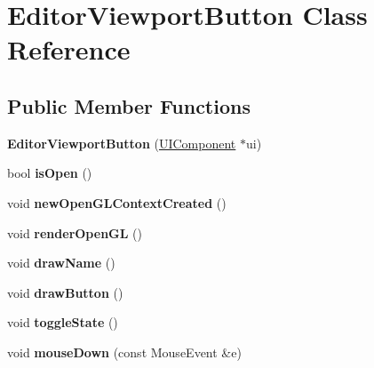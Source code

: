 \hypertarget{classEditorViewportButton}{\section{Editor\-Viewport\-Button Class Reference}
\label{classEditorViewportButton}
}
\subsection*{Public Member Functions}
\begin{DoxyCompactItemize}
\item 
\hypertarget{classEditorViewportButton_a4aacb445c8515a6d5713b3542d12d4d5}{{\bfseries Editor\-Viewport\-Button} (\hyperlink{classUIComponent}{U\-I\-Component} $\ast$ui)}\label{classEditorViewportButton_a4aacb445c8515a6d5713b3542d12d4d5}

\item 
\hypertarget{classEditorViewportButton_ac6ede44d50ca1bb6879c4dbe469520c0}{bool {\bfseries is\-Open} ()}\label{classEditorViewportButton_ac6ede44d50ca1bb6879c4dbe469520c0}

\item 
\hypertarget{classEditorViewportButton_aa33c3aaa4badc7f52dad8ed2e4812eee}{void {\bfseries new\-Open\-G\-L\-Context\-Created} ()}\label{classEditorViewportButton_aa33c3aaa4badc7f52dad8ed2e4812eee}

\item 
\hypertarget{classEditorViewportButton_aa80cea482fd8a27fe27ce42334772b4c}{void {\bfseries render\-Open\-G\-L} ()}\label{classEditorViewportButton_aa80cea482fd8a27fe27ce42334772b4c}

\item 
\hypertarget{classEditorViewportButton_ac59d52952099fd8e225ad2d08eaff16c}{void {\bfseries draw\-Name} ()}\label{classEditorViewportButton_ac59d52952099fd8e225ad2d08eaff16c}

\item 
\hypertarget{classEditorViewportButton_ae802cc7116cb80264fb137aa67468402}{void {\bfseries draw\-Button} ()}\label{classEditorViewportButton_ae802cc7116cb80264fb137aa67468402}

\item 
\hypertarget{classEditorViewportButton_a857d674515278d616cec9b26bb44330d}{void {\bfseries toggle\-State} ()}\label{classEditorViewportButton_a857d674515278d616cec9b26bb44330d}

\item 
\hypertarget{classEditorViewportButton_adc62cdc302d3fe04080459aa0ec97e73}{void {\bfseries mouse\-Down} (const Mouse\-Event \&e)}\label{classEditorViewportButton_adc62cdc302d3fe04080459aa0ec97e73}

\end{DoxyCompactItemize}
